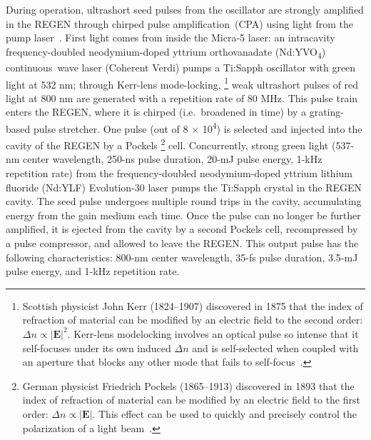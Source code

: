 During operation, ultrashort seed pulses from the oscillator are strongly amplified in the REGEN
through chirped pulse amplification~(CPA) using light from the pump laser~\cite{Strickland1985}.
%
First light comes from inside the Micra-5 laser:
an intracavity frequency-doubled neodymium-doped yttrium orthovanadate (Nd:YVO\textsubscript{4})
continuous~wave laser (Coherent Verdi) pumps a Ti:Sapph oscillator with green light at 532 nm;
through Kerr-lens mode-locking,%
\footnote{Scottish physicist John Kerr (1824--1907) discovered in 1875 that
the index of refraction of material can be modified by an electric field to the second order:
$\Delta n \propto |\boldsymbol{E}|^2$.
Kerr-lens modelocking involves an optical pulse so intense that it self-focuses
under its own induced $\Delta n$ and is self-selected when coupled with an aperture
that blocks any other mode that fails to self-focus~\cite{BoydBook}.}
weak ultrashort pulses of red light at 800 nm are generated
with a repetition rate of 80 MHz. This pulse train enters the REGEN,
where it is chirped (i.e.~broadened in time) by a grating-based pulse stretcher.
One pulse (out of 8 $\times$ 10\textsuperscript{4}) is selected and injected
into the cavity of the REGEN by a Pockels%
\footnote{German physicist Friedrich Pockels (1865--1913) discovered in 1893 that
the index of refraction of material can be modified by an electric field to the first order:
$\Delta n \propto |\boldsymbol{E}|$. This effect can be used to quickly and precisely control
the polarization of a light beam~\cite{BoydBook}.} cell.
Concurrently, strong green light (537-nm center wavelength, 250-ns pulse duration, 20-mJ pulse energy,
1-kHz repetition rate) from the frequency-doubled
neodymium-doped yttrium lithium fluoride (Nd:YLF) Evolution-30 laser pumps
the Ti:Sapph crystal in the REGEN cavity.
The seed pulse undergoes multiple round trips in the cavity,
accumulating energy from the gain medium each time.
Once the pulse can no longer be further amplified,
it is ejected from the cavity by a second Pockels cell, recompressed by a pulse compressor,
and allowed to leave the REGEN. This output pulse has the following characteristics:
800-nm center wavelength, 35-fs pulse duration, 3.5-mJ pulse energy, and 1-kHz repetition rate.

